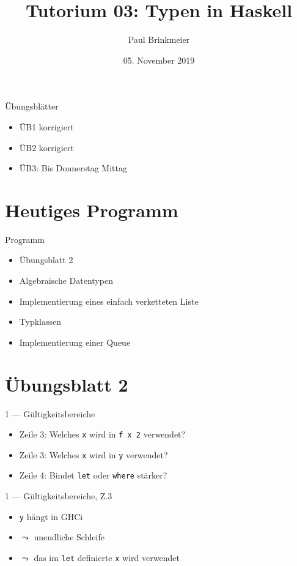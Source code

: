 \documentclass{beamer}
\title{Tutorium 03: Typen in Haskell}
\author{Paul Brinkmeier}
\institute{Tutorium Programmierparadigmen am KIT}
\date{05. November 2019}
\newcommand{\code}[1]{
	\begin{mdframed}
		
	\end{mdframed}
}
\begin{document}
\begin{frame}
	\titlepage
\end{frame}

\begin{frame}{Übungsblätter}
	\begin{itemize}
		\item ÜB1 korrigiert
		\item ÜB2 korrigiert
		\item ÜB3: Bis Donnerstag Mittag
	\end{itemize}
\end{frame}

\section{Heutiges Programm}
\begin{frame}{Programm}
	\begin{itemize}
		\item Übungsblatt 2
		\item Algebraische Datentypen
		\item Implementierung eines einfach verketteten Liste
		\item Typklassen
		\item Implementierung einer Queue
	\end{itemize}
\end{frame}

\section{Übungsblatt 2}

\begin{frame}{1 --- Gültigkeitsbereiche}
	\code{demos/Binding.hs}

	\begin{itemize}
		\item Zeile 3: Welches \texttt{x} wird in \texttt{f x 2} verwendet?
		\item Zeile 3: Welches \texttt{x} wird in \texttt{y} verwendet?
		\item Zeile 4: Bindet \texttt{let} oder \texttt{where} stärker?
	\end{itemize}
\end{frame}

\begin{frame}{1 --- Gültigkeitsbereiche, Z.3}
	\code{demos/LetXInFx.hs}
	\pause
	\begin{itemize}
		\item \texttt{y} hängt in GHCi
		\item $\leadsto$ unendliche Schleife
		\item $\leadsto$ das im \texttt{let} definierte \texttt{x} wird verwendet
	\end{itemize}
\end{frame}
\end{document}
